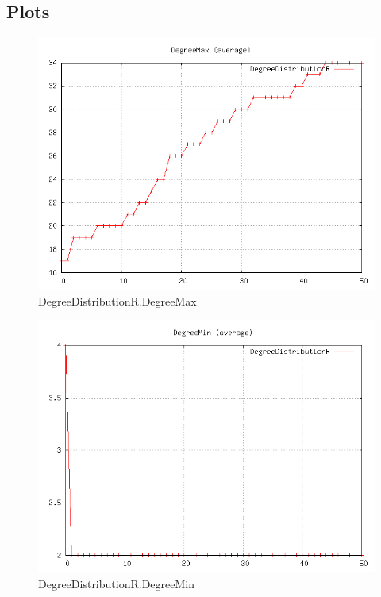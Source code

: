 \subsection{Plots}

\begin{figure} [h]
	\centering
	\includegraphics [scale=0.8] {plots/DegreeDistributionR.DegreeMax}
	\caption{DegreeDistributionR.DegreeMax}
	\label{plot:RANDOM_100_500 - BARABASI_ALBERT_GROWTH_10_2.DegreeDistributionR.DegreeMax}
\end{figure}

\begin{figure} [h]
	\centering
	\includegraphics [scale=0.8] {plots/DegreeDistributionR.DegreeMin}
	\caption{DegreeDistributionR.DegreeMin}
	\label{plot:RANDOM_100_500 - BARABASI_ALBERT_GROWTH_10_2.DegreeDistributionR.DegreeMin}
\end{figure}

